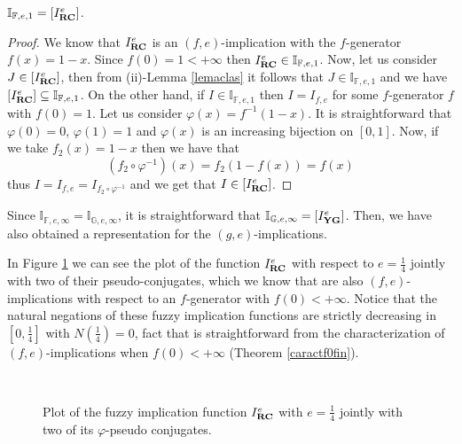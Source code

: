 \begin{theorem} $\mathbb{I}_{\mathbb{F},e,1} = [I_{\bf RC}^e]$.
\end{theorem}
\begin{proof}
	We know that $I_{\bf RC}^e$ is an $(f,e)$-implication with the $f$-generator $f(x)=1-x$. Since $f(0)=1 < + \infty$ then $I_{\bf RC}^e \in \mathbb{I}_{\mathbb{F},e,1}$. Now, let us consider $J \in [I_{\bf RC}^e]$, then from (ii)-Lemma \ref{lemaclas} it follows that $J \in \mathbb{I}_{\mathbb{F},e,1}$ and we have $[I_{\bf RC}^e] \subseteq \mathbb{I}_{\mathbb{F},e,1}$. On the other hand, if $I \in \mathbb{I}_{\mathbb{F},e,1}$ then $I=I_{f,e}$ for some $f$-generator $f$ with $f(0) = 1$. Let us consider $\varphi(x)=f^{-1}(1-x)$. It is straightforward that $\varphi(0)=0$, $\varphi(1)=1$ and $\varphi(x)$ is an increasing bijection on $[0,1]$. Now, if we take $f_2(x)=1-x$ then we have that
	$$(f_2 \circ \varphi^{-1})(x)=f_2(1-f(x))=f(x)$$
	thus $I=I_{f,e}=I_{f_2 \circ \varphi^{-1}}$ and we get that $I \in [I_{\bf RC}^e]$.
\end{proof}


\begin{remark} Since $\mathbb{I}_{\mathbb{F},e,\infty} = \mathbb{I}_{\mathbb{G},e,\infty}$, it is straightforward that $\mathbb{I}_{\mathbb{G},e,\infty} = [I_{\bf YG}^e]$. Then, we have also obtained a representation for the $(g,e)$-implications.
\end{remark}

\begin{example} In Figure \ref{(f,e)conj} we can see the plot of the function $I_{\bf RC}^e$ with respect to $e=\frac{1}{4}$ jointly with two of their pseudo-conjugates, which we know that are also $(f,e)$-implications with respect to an $f$-generator with $f(0)<+\infty$. Notice that the natural negations of these fuzzy implication functions are strictly decreasing in $[0, \frac{1}{4}]$ with $N\left(\frac{1}{4}\right)=0$, fact that is straightforward from the characterization of $(f,e)$-implications when $f(0)<+\infty$ (Theorem \ref{caractf0fin}).
	\begin{figure}[t]
		\centering
		 \quad
		 \quad
		\\
		\caption{Plot of the fuzzy implication function $I_{\bf RC}^e$ with $e=\frac{1}{4}$ jointly with two of its $\varphi$-pseudo conjugates.}\label{(f,e)conj}
	\end{figure}
\end{example}

